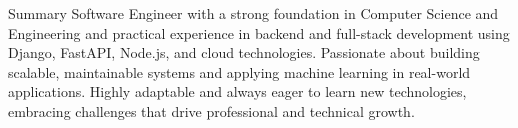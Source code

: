 \documentclass[11pt]{resume}
\begin{document}

\begin{rSection}{Summary}
Software Engineer with a strong foundation in Computer Science and Engineering and practical experience in backend and full-stack development using Django, FastAPI, Node.js, and cloud technologies. Passionate about building scalable, maintainable systems and applying machine learning in real-world applications. Highly adaptable and always eager to learn new technologies, embracing challenges that drive professional and technical growth.
\end{rSection}

\end{document}
